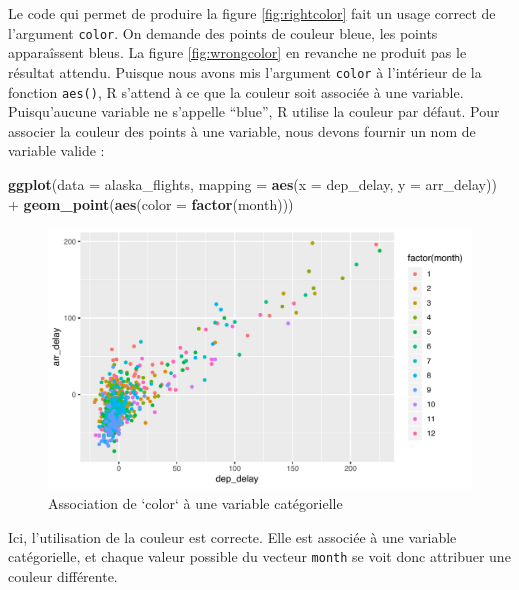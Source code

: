 \documentclass[a4paperpaper,]{article}
\newenvironment{Shaded}{\begin{snugshade}}{\end{snugshade}}
\newcommand{\DataTypeTok}[1]{\textcolor[rgb]{0.00,0.34,0.68}{#1}}
\newcommand{\KeywordTok}[1]{\textcolor[rgb]{0.12,0.11,0.11}{\textbf{#1}}}
\newcommand{\NormalTok}[1]{\textcolor[rgb]{0.12,0.11,0.11}{#1}}
\newcommand{\OperatorTok}[1]{\textcolor[rgb]{0.12,0.11,0.11}{#1}}
\newcommand{\StringTok}[1]{\textcolor[rgb]{0.75,0.01,0.01}{#1}}
\theoremstyle{definition}
\theoremstyle{definition}
\theoremstyle{definition}
\theoremstyle{remark}
\begin{document}
Le code qui permet de produire la figure \ref{fig:rightcolor} fait un
usage correct de l'argument \texttt{color}. On demande des points de
couleur bleue, les points apparaîssent bleus. La figure
\ref{fig:wrongcolor} en revanche ne produit pas le résultat attendu.
Puisque nous avons mis l'argument \texttt{color} à l'intérieur de la
fonction \texttt{aes()}, R s'attend à ce que la couleur soit associée à
une variable. Puisqu'aucune variable ne s'appelle ``blue'', R utilise la
couleur par défaut. Pour associer la couleur des points à une variable,
nous devons fournir un nom de variable valide :

\begin{Shaded}
\begin{Highlighting}[]
\KeywordTok{ggplot}\NormalTok{(}\DataTypeTok{data =}\NormalTok{ alaska_flights, }\DataTypeTok{mapping =} \KeywordTok{aes}\NormalTok{(}\DataTypeTok{x =}\NormalTok{ dep_delay, }\DataTypeTok{y =}\NormalTok{ arr_delay)) }\OperatorTok{+}
\StringTok{  }\KeywordTok{geom_point}\NormalTok{(}\KeywordTok{aes}\NormalTok{(}\DataTypeTok{color =} \KeywordTok{factor}\NormalTok{(month)))}
\end{Highlighting}
\end{Shaded}

\begin{figure}[htpb]

{\centering \includegraphics[width=0.9\linewidth]{figure/varcolor-1} 

}

\caption{Association de `color` à une variable catégorielle}\label{fig:varcolor}
\end{figure}

Ici, l'utilisation de la couleur est correcte. Elle est associée à une
variable catégorielle, et chaque valeur possible du vecteur
\texttt{month} se voit donc attribuer une couleur différente.
\end{document}
